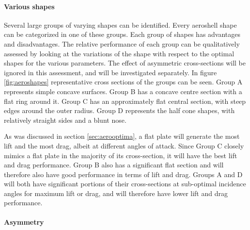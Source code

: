\paragraph{Various shapes} \label{sec:aeroshapes}
Several large groups of varying shapes can be identified. Every aeroshell shape can be categorized in one of these groups.  Each group of shapes has advantages and disadvantages. The relative performance of each group can be qualitatively assessed by looking at the variations of the shape with respect to the optimal shapes for the various parameters. The effect of asymmetric cross-sections will be ignored in this assessment, and will be investigated separately. In figure \ref{fig:aeroshapes} representative cross sections of the groups can be seen. Group A represents simple concave surfaces. Group B has a concave centre section with a flat ring around it. Group C has an approximately flat central section, with steep edges around the outer radius. Group D represents the half cone shapes, with relatively straight sides and a blunt nose. 

As was discussed in section \ref{sec:aerooptima}, a flat plate will generate the most lift and the most drag, albeit at different angles of attack. Since Group C closely mimics a flat plate in the majority of its cross-section, it will have the best lift and drag performance. Group B also has a significant flat section and will therefore also have good performance in terms of lift and drag. Groups A and D will both have significant portions of their cross-sections at sub-optimal incidence angles for maximum lift or drag, and will therefore have lower lift and drag performance.



\paragraph{Asymmetry}
























